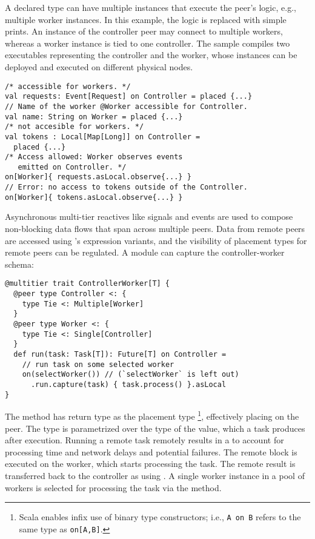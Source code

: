 A declared  type can have multiple instances that execute the peer's logic, e.g., multiple worker instances.
%
In this example, the logic is replaced with simple prints.
%
An instance of the controller peer may connect to multiple workers, whereas a worker instance is tied to one controller. 
%
The sample compiles two executables representing the controller and the worker, whose instances can be deployed and executed on different physical nodes.
\begin{verbatim}
/* accessible for workers. */
val requests: Event[Request] on Controller = placed {...}
// Name of the worker @Worker accessible for Controller.
val name: String on Worker = placed {...}
/* not accesible for workers. */
val tokens : Local[Map[Long]] on Controller = 
  placed {...}
/* Access allowed: Worker observes events 
   emitted on Controller. */
on[Worker]{ requests.asLocal.observe{...} }
// Error: no access to tokens outside of the Controller.
on[Worker]{ tokens.asLocal.observe{...} }
\end{verbatim}

Asynchronous multi-tier reactives like signals and events are used to compose non-blocking data flows that span across multiple peers. 
%
Data from remote peers are accessed using \scalaloci{}'s  expression variants,
and the visibility of placement types for remote peers can be regulated.
%
A  module can capture the controller-worker schema:

\begin{verbatim}
@multitier trait ControllerWorker[T] {
  @peer type Controller <: { 
    type Tie <: Multiple[Worker]
  }
  @peer type Worker <: { 
    type Tie <: Single[Controller] 
  }
  def run(task: Task[T]): Future[T] on Controller =
    // run task on some selected worker
    on(selectWorker()) // (`selectWorker` is left out) 
      .run.capture(task) { task.process() }.asLocal
}
\end{verbatim}
The  method has return type as the placement type \footnote{Scala enables infix use of binary type constructors;  i.e., \texttt{A on B} refers to the same type as \texttt{on[A,B]}.}, effectively placing  on the  peer. 
%
The  type is parametrized over the type  of the value, which a task produces after execution. 
%
Running a remote task remotely results in a  to account for processing time and network delays and potential failures. 
%
The remote block is executed on the worker, which starts processing the task. 
%
The remote result is transferred back to the controller as  using . 
%
A single worker instance in a pool of workers is selected for processing the task via the  method. 

